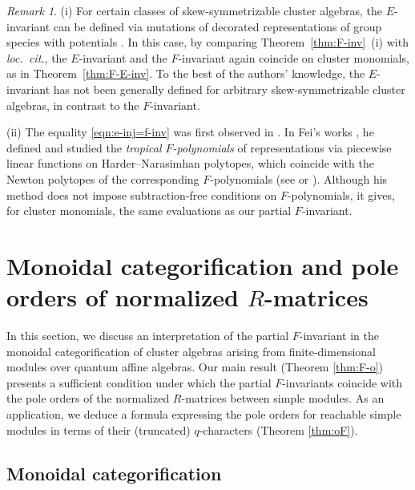 \documentclass[12pt]{amsart}
\theoremstyle{definition}
\theoremstyle{remark}
\newtheorem{remark}[theorem]{Remark}
\numberwithin{equation}{section}
\begin{document}
\begin{remark}\label{rmk-end}
(i) For certain classes of skew-symmetrizable cluster algebras, the $E$-invariant can be defined via mutations of decorated representations of group species with potentials \cite[Theorem~10.1]{Dem10}. In this case, by comparing Theorem~\ref{thm:F-inv}~(i) with \textit{loc.~cit.}, the $E$-invariant and the $F$-invariant again coincide on cluster monomials, as in Theorem~\ref{thm:F-E-inv}. To the best of the authors' knowledge, the $E$-invariant has not been generally defined for arbitrary skew-symmetrizable cluster algebras, in contrast to the $F$-invariant.



        (ii) The equality \eqref{eqn:e-inj=f-inv} was first observed in \cite[Theorem~3.22]{fei_2019b}. In Fei's works \cite{fei_2019a,fei_2019b}, he defined and studied the \emph{tropical $F$-polynomials} of representations via piecewise linear functions on Harder--Narasimhan polytopes, which coincide with the Newton polytopes of the corresponding $F$-polynomials (see \cite[Remark 2.4 (1)] {fei_2019a} or \cite[Corollary 3.3]{BKT-2014}). Although his method does not impose subtraction-free conditions on $F$-polynomials, it gives, for cluster monomials, the same evaluations as our partial $F$-invariant.
\end{remark}










\section{Monoidal categorification and pole orders of normalized $R$-matrices}\label{sec:pole-order}

In this section, we discuss an interpretation of the partial $F$-invariant in the monoidal categorification of cluster algebras arising from finite-dimensional modules over quantum affine algebras. 
Our main result (Theorem \ref{thm:F-o}) presents a sufficient condition under which the partial $F$-invariants coincide with the pole orders of the normalized $R$-matrices between simple modules.
As an application, we deduce a formula expressing the pole orders for reachable simple modules in terms of their (truncated) $q$-characters (Theorem \ref{thm:oF}).

\subsection{Monoidal categorification}
\end{document}
